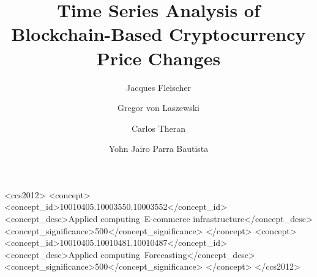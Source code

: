 \documentclass[sigconf]{acmart}
\begin{document}
\title{Time Series Analysis of Blockchain-Based Cryptocurrency Price Changes}

\author{Jacques Fleischer}

\author{Gregor von Laszewski}

\author{Carlos Theran}

\author{Yohn Jairo Parra Bautista}


\renewcommand{\shortauthors}{J.P. Fleischer, G. von Laszewski, C. Theran, Y. J. Parra Bautista.}



\begin{CCSXML}
<ccs2012>
 <concept>
  <concept_id>10010405.10003550.10003552</concept_id>
  <concept_desc>Applied computing~E-commerce infrastructure</concept_desc>
  <concept_significance>500</concept_significance>
 </concept>
 <concept>
  <concept_id>10010405.10010481.10010487</concept_id>
  <concept_desc>Applied computing~Forecasting</concept_desc>
  <concept_significance>500</concept_significance>
 </concept>
</ccs2012>
\end{CCSXML}



\maketitle


\end{document}
